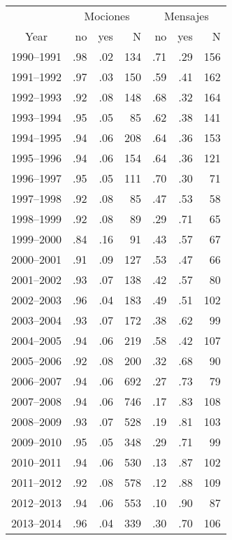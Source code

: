 \documentclass{article}
\newcommand{\mc}{\multicolumn}
\begin{document}
\begin{table}
\begin{center}
\begin{tabular}{crrr|rrr}
        & \mc{3}{c}{Mociones} & \mc{3}{c}{Mensajes} \\
Year        &  no & yes &  N  &  no & yes &  N  \\ \hline
1990--1991  & .98 & .02 &134   & .71 & .29& 156 \\
1991--1992  & .97 & .03 &150   & .59 & .41& 162 \\
1992--1993  & .92 & .08 &148   & .68 & .32& 164 \\
1993--1994  & .95 & .05 & 85   & .62 & .38& 141 \\ \hline
1994--1995  & .94 & .06 &208   & .64 & .36& 153 \\
1995--1996  & .94 & .06 &154   & .64 & .36& 121 \\
1996--1997  & .95 & .05 &111   & .70 & .30&  71 \\
1997--1998  & .92 & .08 &85    & .47 & .53& 58  \\ \hline
1998--1999  & .92 & .08 &89    & .29 & .71& 65  \\
1999--2000  & .84 & .16 &91    & .43 & .57& 67  \\
2000--2001  & .91 & .09 &127   & .53 & .47&  66 \\
2001--2002  & .93 & .07 &138   & .42 & .57&  80 \\ \hline
2002--2003  & .96 & .04 &183   & .49 & .51& 102 \\
2003--2004  & .93 & .07 &172   & .38 & .62&  99 \\
2004--2005  & .94 & .06 &219   & .58 & .42& 107 \\
2005--2006  & .92 & .08 &200   & .32 & .68&  90 \\ \hline
2006--2007  & .94 & .06 &692   & .27 & .73&  79 \\
2007--2008  & .94 & .06 &746   & .17 & .83& 108 \\
2008--2009  & .93 & .07 &528   & .19 & .81& 103 \\
2009--2010  & .95 & .05 &348   & .29 & .71&  99 \\ \hline
2010--2011  & .94 & .06 &530   & .13 & .87& 102 \\
2011--2012  & .92 & .08 &578   & .12 & .88& 109 \\
2012--2013  & .94 & .06 &553   & .10 & .90&  87 \\
2013--2014  & .96 & .04 &339   & .30 & .70& 106 \\ \hline \hline

\end{tabular}
\end{center}
\end{table}
\end{document}
